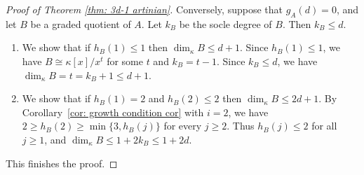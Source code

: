 \documentclass[11pt]{amsart}
\newtheorem{lemma}[theorem]{Lemma}
\theoremstyle{definition}
\newcommand{\PPP}{\mathbb{P}}
\newcommand{\dimk}{\dim_{\kappa}}
\begin{document}
\begin{proof}[Proof of Theorem \ref{thm: 3d-1 artinian}]
Conversely, suppose that $g_A(d)=0$, and let $B$ be a graded quotient of $A$. Let $k_B$ be the socle degree of $B$. Then $k_B \leq d$.
\begin{enumerate}
    \item We show that if $h_B(1) \leq 1$ then $\dimk B \leq d+1$. Since $h_B(1) \leq 1$, we have $B \cong \kappa[x]/x^t$ for some $t$ and $k_B=t-1$. Since $k_B \leq d$, we have $\dimk B=t=k_B+1 \leq d+1$.
    \item We show that if $h_B(1)=2$ and $h_B(2) \leq 2$ then $\dimk B \leq 2d+1$.
    By Corollary~\ref{cor: growth condition cor} with $i=2$, we have $2\geq h_B(2)\geq\min\{3,h_B(j)\}$ for every $j\geq2$.
    Thus $h_B(j)\leq2$ for all $j\geq1$, and $\dim_\kappa B\leq1+2k_B\leq1+2d$.
\end{enumerate}
This finishes the proof.
\end{proof}









        

\end{document}

